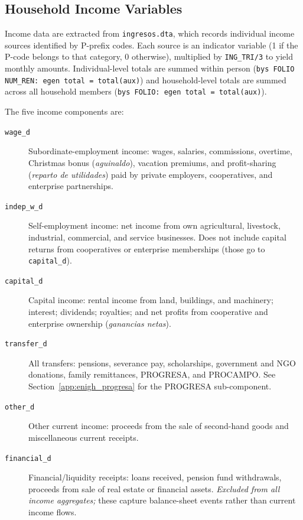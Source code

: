 \subsection{Household Income Variables}
\label{app:enigh_income}

Income data are extracted from \texttt{ingresos.dta}, which records individual
income sources identified by P-prefix codes. Each source is an indicator
variable (1 if the P-code belongs to that category, 0 otherwise), multiplied by
\texttt{ING\_TRI/3} to yield monthly amounts. Individual-level totals are
summed within person (\texttt{bys FOLIO NUM\_REN: egen total = total(aux)}) and
household-level totals are summed across all household members
(\texttt{bys FOLIO: egen total = total(aux)}).

The five income components are:

\begin{description}
  \item[\texttt{wage\_d}] Subordinate-employment income: wages, salaries,
    commissions, overtime, Christmas bonus (\textit{aguinaldo}), vacation
    premiums, and profit-sharing (\textit{reparto de utilidades}) paid by
    private employers, cooperatives, and enterprise partnerships.
  \item[\texttt{indep\_w\_d}] Self-employment income: net income from own
    agricultural, livestock, industrial, commercial, and service businesses.
    Does not include capital returns from cooperatives or enterprise
    memberships (those go to \texttt{capital\_d}).
  \item[\texttt{capital\_d}] Capital income: rental income from land,
    buildings, and machinery; interest; dividends; royalties; and net profits
    from cooperative and enterprise ownership (\textit{ganancias netas}).
  \item[\texttt{transfer\_d}] All transfers: pensions, severance pay,
    scholarships, government and NGO donations, family remittances, PROGRESA,
    and PROCAMPO. See Section~\ref{app:enigh_progresa} for the PROGRESA
    sub-component.
  \item[\texttt{other\_d}] Other current income: proceeds from the sale of
    second-hand goods and miscellaneous current receipts.
  \item[\texttt{financial\_d}] Financial/liquidity receipts: loans received,
    pension fund withdrawals, proceeds from sale of real estate or financial
    assets. \textit{Excluded from all income aggregates;} these capture
    balance-sheet events rather than current income flows.
\end{description}

